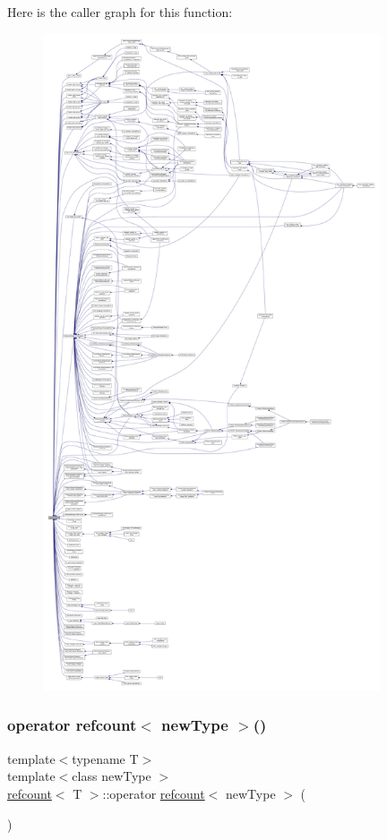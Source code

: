 Here is the caller graph for this function\+:
\nopagebreak
\begin{figure}[H]
\begin{center}
\leavevmode
\includegraphics[height=550pt]{d3/d86/structrefcount_ad8aa243007f3818b8e7a69f57b92cda0_icgraph}
\end{center}
\end{figure}
\mbox{\label{structrefcount_ac667e03eba9bbeeebb38eb85155c1a69}} 
\subsubsection{\texorpdfstring{operator refcount$<$ new\+Type $>$()}{operator refcount< newType >()}}
{\footnotesize\ttfamily template$<$typename T$>$ \\
template$<$class new\+Type $>$ \\
\hyperlink{structrefcount}{refcount}$<$ T $>$\+::operator \hyperlink{structrefcount}{refcount}$<$ new\+Type $>$ (\begin{DoxyParamCaption}{ }\end{DoxyParamCaption})\hspace{0.3cm}{\ttfamily [inline]}}



